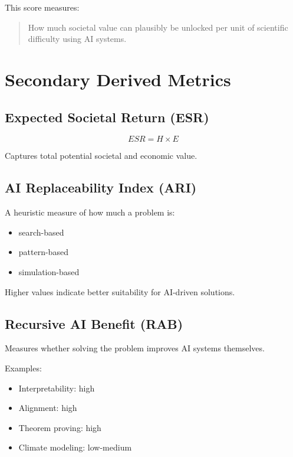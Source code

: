 \documentclass[11pt]{article}
\begin{document}
This score measures:

\begin{quote}
How much societal value can plausibly be unlocked per unit of scientific difficulty using AI systems.
\end{quote}

\section{Secondary Derived Metrics}

\subsection{Expected Societal Return (ESR)}

\begin{equation}
ESR = H \times E
\end{equation}

Captures total potential societal and economic value.

\subsection{AI Replaceability Index (ARI)}

A heuristic measure of how much a problem is:

\begin{itemize}
    \item search-based
    \item pattern-based
    \item simulation-based
\end{itemize}

Higher values indicate better suitability for AI-driven solutions.

\subsection{Recursive AI Benefit (RAB)}

Measures whether solving the problem improves AI systems themselves.

Examples:
\begin{itemize}
    \item Interpretability: high
    \item Alignment: high
    \item Theorem proving: high
    \item Climate modeling: low-medium
\end{itemize}
\end{document}
